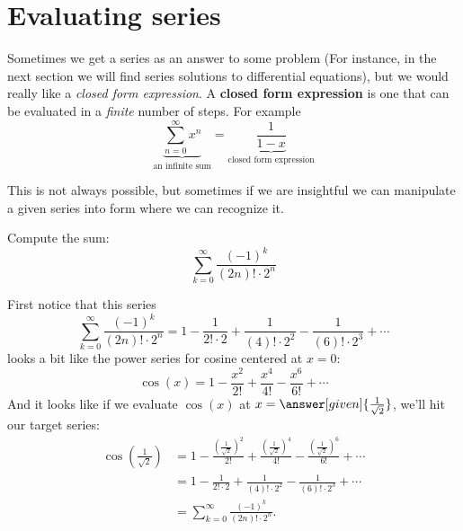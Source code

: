 \documentclass{ximera}
\begin{document}
\section{Evaluating series}

Sometimes we get a series as an answer to some problem (For instance,
in the next section we will find series solutions to differential
equations), but we would really like a \textit{closed form expression}. A \textbf{closed form expression}
is one that can be evaluated in a \textit{finite} number of steps. For example
\[
\underbrace{\sum_{n=0}^\infty x^n}_\text{an infinite sum}  = \underbrace{\frac{1}{1-x}}_{\text{closed form expression}}
\]




This is not always possible, but sometimes if we are insightful we can
manipulate a given series into form where we can recognize it.


\begin{example}
  Compute the sum:
  \[
  \sum_{k=0}^\infty \frac{(-1)^k}{(2n)!\cdot 2^n}
  \]
  \begin{explanation}
    First notice that this series
    \[
    \sum_{k=0}^\infty \frac{(-1)^k}{(2n)!\cdot 2^n} = 1 - \frac{1}{2!\cdot 2} + \frac{1}{(4)!\cdot 2^2}-\frac{1}{(6)!\cdot 2^3} + \cdots
    \]
    looks a bit like the power series for cosine centered at $x=0$:
    \[
    \cos(x) = 1-\frac{x^2}{2!} + \frac{x^4}{4!} - \frac{x^6}{6!}+ \cdots
    \]
    And it looks like if we evaluate $\cos(x)$ at $x =
    \answer[given]{\frac{1}{\sqrt{2}}}$, we'll hit our target series:
    \begin{align*}
      \cos\left(\frac{1}{\sqrt{2}}\right) &=1-\frac{\left(\frac{1}{\sqrt{2}}\right)^2}{2!} + \frac{\left(\frac{1}{\sqrt{2}}\right)^4}{4!} - \frac{\left(\frac{1}{\sqrt{2}}\right)^6}{6!}+ \cdots\\
      &= 1 - \frac{1}{2!\cdot 2} + \frac{1}{(4)!\cdot 2^2}-\frac{1}{(6)!\cdot 2^3} + \cdots\\
      &=\sum_{k=0}^\infty \frac{(-1)^k}{(2n)!\cdot 2^n}.
    \end{align*}
  \end{explanation}
\end{example}
\end{document}
